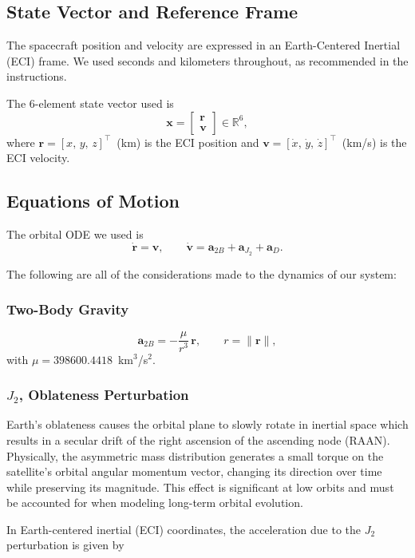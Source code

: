 \documentclass[12pt]{article}
\begin{document}
\subsection{State Vector and Reference Frame}

The spacecraft position and velocity are expressed in an Earth-Centered Inertial (ECI) frame. We used seconds and kilometers throughout, as recommended in the instructions.

\par
The 6-element state vector used is
\[
\mathbf{x} = \begin{bmatrix} \mathbf{r} \\ \mathbf{v} \end{bmatrix} \in \mathbb{R}^6,
\]
where $\mathbf{r} = [x,\, y,\, z]^\top$~(km) is the ECI position and
$\mathbf{v} = [\dot{x},\, \dot{y},\, \dot{z}]^\top$~(km/s) is the ECI velocity.

\subsection{Equations of Motion}

The orbital ODE we used is
\[
\dot{\mathbf{r}} = \mathbf{v}, \qquad
\dot{\mathbf{v}} = \mathbf{a}_{2B} + \mathbf{a}_{J_2} + \mathbf{a}_{D}.
\]

The following are all of the considerations made to the dynamics of our system:
\subsubsection*{Two-Body Gravity}
\[
\mathbf{a}_{2B} = -\frac{\mu}{r^3}\,\mathbf{r}, \qquad r = \|\mathbf{r}\|,
\]
with $\mu = 398600.4418$~km$^3$/s$^2$.

\subsubsection*{$J_2$, Oblateness Perturbation}

Earth's oblateness causes the orbital plane to slowly rotate in inertial space which results in a secular drift of the right ascension of the ascending node (RAAN). Physically, the asymmetric mass distribution generates a small torque on the satellite’s orbital angular momentum vector, changing its direction over time while preserving its magnitude. This effect is significant at low orbits and must be accounted for when modeling long-term orbital evolution.

In Earth-centered inertial (ECI) coordinates, the acceleration due to the $J_2$ perturbation is given by \cite{Vallado2013}
\end{document}
